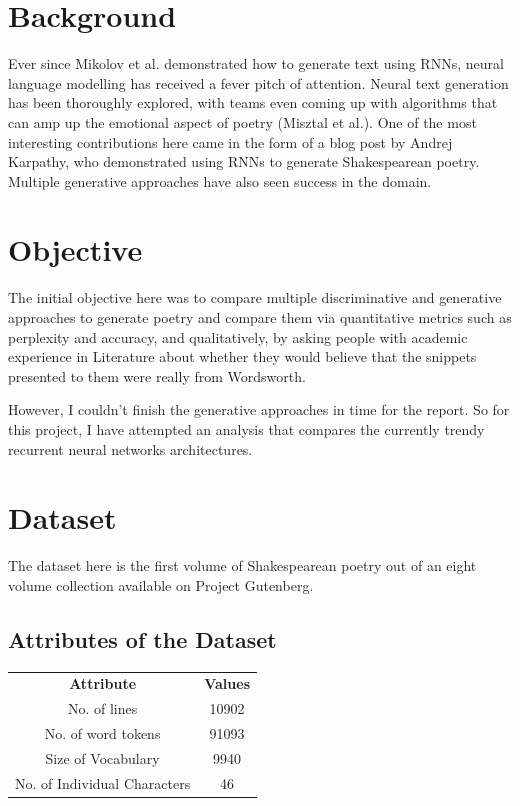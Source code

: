 \documentclass[15pt]{article}
\begin{document}
\section{Background}
Ever since Mikolov et al. demonstrated how to generate text using RNNs, neural language modelling has received a fever pitch of attention. Neural text generation has been thoroughly explored, with teams even coming up with algorithms that can amp up the emotional aspect of poetry (Misztal et al.).  One of the most interesting contributions here came in the form of a blog post by Andrej Karpathy, who demonstrated using RNNs to generate Shakespearean poetry. Multiple generative approaches have also seen success in the domain.

\section{Objective}
The initial objective here was to compare multiple discriminative and generative approaches to generate poetry and compare them via quantitative metrics such as perplexity and accuracy, and qualitatively, by asking people with academic experience in Literature about whether they would believe that the snippets presented to them were really from Wordsworth.

However, I couldn't finish the generative approaches in time for the report. So for this project, I have attempted an analysis that compares the currently trendy recurrent neural networks architectures.


\section{Dataset}
The dataset here is the first volume of Shakespearean poetry out of an eight volume collection available on Project Gutenberg.  
\subsection{Attributes of the Dataset}
\begin{center}
\begin{tabular}{c c}
\textbf{Attribute} & \textbf{Values} \\
No. of lines & 10902 \\
No. of word tokens & 91093 \\
Size of Vocabulary & 9940 \\
No. of Individual Characters & 46
\end{tabular}
\end{center}
\end{document}
